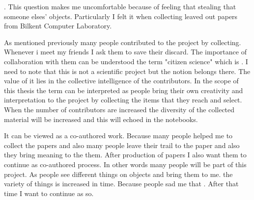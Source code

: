  \cite{zimring2012encyclopedia}. This question makes me uncomfortable because of feeling that stealing that someone elses' objects. Particularly I felt it when collecting leaved out papers from Bilkent Computer Laboratory.



As mentioned previously many people contributed to the project by collecting. Whenever i meet my friends I ask them to save their discard. The importance of collaboration with them can be understood the term "citizen science" which is  \citep{robson2012using}. I need to note that this is not a scientific project but the notion belongs there. The value of it lies in the collective intelligence of the contributors. In the scope of this thesis the term can be interpreted as people bring their own creativity and interpretation to the project by collecting the items that they reach and select. When the number of contributors are increased the diversity of the collected material will be increased and this will echoed in the notebooks. 

It can be viewed as a co-authored work. Because many people helped me to collect the papers and also many people leave their trail to the paper and also they bring meaning to the them. After production of papers I also want them to continue as co-authored process. In other words many people will be part of this project. As people see different things on objects and bring them to me. the variety of things is increased in time. Because people sad me that . After that time I want to continue as so.

